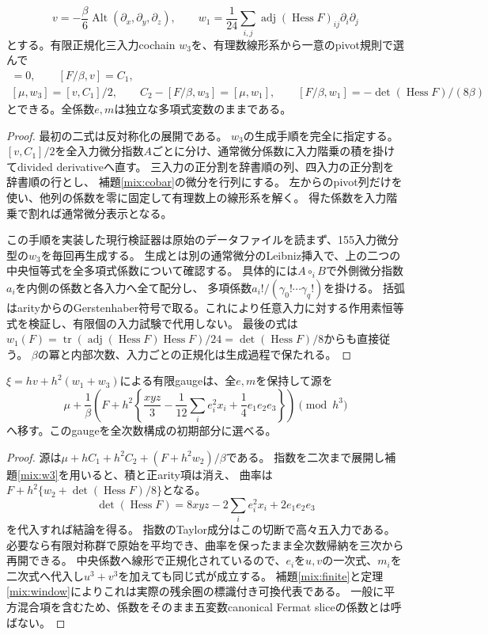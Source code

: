\begin{lemma}[再生成できる有限原始]\label{mix:w3}
\[
 v=-\frac\beta6\operatorname{Alt}(\partial_x,\partial_y,\partial_z),\qquad
 w_1=\frac1{24}\sum_{i,j}\operatorname{adj}(\operatorname{Hess}F)_{ij}\partial_i\partial_j
\]
とする。有限正規化三入力cochain $w_3$を、有理数線形系から一意のpivot規則で選んで
\begin{gather*}
 [\mu,v]=0,\qquad[F/\beta,v]=C_1,\\
 [\mu,w_3]=[v,C_1]/2,\qquad
 C_2-[F/\beta,w_3]=[\mu,w_1],\qquad
 [F/\beta,w_1]=-\det(\operatorname{Hess}F)/(8\beta)
\end{gather*}
とできる。全係数$e,m$は独立な多項式変数のままである。
\end{lemma}
\begin{proof}
最初の二式は反対称化の展開である。
$w_3$の生成手順を完全に指定する。
$[v,C_1]/2$を全入力微分指数$A$ごとに分け、通常微分係数に入力階乗の積を掛けてdivided derivativeへ直す。
三入力の正分割を辞書順の列、四入力の正分割を辞書順の行とし、
補題\ref{mix:cobar}の微分を行列にする。
左からのpivot列だけを使い、他列の係数を零に固定して有理数上の線形系を解く。
得た係数を入力階乗で割れば通常微分表示となる。

この手順を実装した現行検証器は原始のデータファイルを読まず、155入力微分型の$w_3$を毎回再生成する。
生成とは別の通常微分のLeibniz挿入で、上の二つの中央恒等式を全多項式係数について確認する。
具体的には$A\circ_iB$で外側微分指数$a_i$を内側の係数と各入力へ全て配分し、
多項係数$a_i!/(\gamma_0!\cdots\gamma_q!)$を掛ける。
括弧はarityからのGerstenhaber符号で取る。これにより任意入力に対する作用素恒等式を検証し、有限個の入力試験で代用しない。
最後の式は
$w_1(F)=\operatorname{tr}(\operatorname{adj}(\operatorname{Hess}F)\operatorname{Hess}F)/24
=\det(\operatorname{Hess}F)/8$からも直接従う。
$\beta$の冪と内部次数、入力ごとの正規化は生成過程で保たれる。
\end{proof}

\begin{theorem}\label{mix:secondcurve}
$\xi=hv+h^2(w_1+w_3)$による有限gaugeは、全$e,m$を保持して源を
\[
 \mu+\frac1\beta\left(F+h^2\left\{\frac{xyz}3-
 \frac1{12}\sum_i e_i^2x_i+\frac14e_1e_2e_3\right\}\right)
 \pmod{h^3}
\]
へ移す。このgaugeを全次数構成の初期部分に選べる。
\end{theorem}
\begin{proof}
源は$\mu+hC_1+h^2C_2+(F+h^2w_2)/\beta$である。
指数を二次まで展開し補題\ref{mix:w3}を用いると、積と正arity項は消え、
曲率は$F+h^2\{w_2+\det(\operatorname{Hess}F)/8\}$となる。
\[
 \det(\operatorname{Hess}F)=8xyz-2\sum_i e_i^2x_i+2e_1e_2e_3
\]
を代入すれば結論を得る。
指数のTaylor成分はこの切断で高々五入力である。
必要なら有限対称群で原始を平均でき、曲率を保ったまま全次数帰納を三次から再開できる。
中央係数へ線形で正規化されているので、$e_i$を$u,v$の一次式、$m_i$を二次式へ代入し$u^3+v^3$を加えても同じ式が成立する。
補題\ref{mix:finite}と定理\ref{mix:window}によりこれは実際の残余圏の標識付き可換代表である。
一般に平方混合項を含むため、係数をそのまま五変数canonical Fermat sliceの係数とは呼ばない。
\end{proof}

